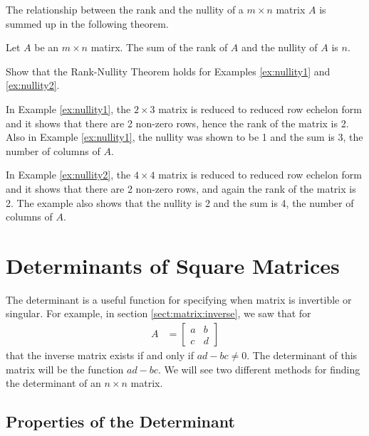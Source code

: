 The relationship between the rank and the nullity of a $m \times n$ matrix $A$ is summed up in the following theorem.

\begin{theorem} \label{thm:rank:nullity}
Let $A$ be an $m \times n$ matirx.  The sum of the rank of $A$ and the nullity of $A$ is $n$. 
\end{theorem}

\begin{example}
Show that the Rank-Nullity Theorem holds for Examples \ref{ex:nullity1} and \ref{ex:nullity2}.

\solution

In Example \ref{ex:nullity1}, the $2 \times 3$ matrix is reduced to reduced row echelon form and it shows that there are 2 non-zero rows, hence the rank of the matrix is 2.  Also in Example \ref{ex:nullity1}, the nullity was shown to be 1 and the sum is 3, the number of columns of $A$. 

In Example \ref{ex:nullity2}, the $4 \times 4$ matrix is reduced to reduced row echelon form and it shows that there are 2 non-zero rows, and again the rank of the matrix is 2.  The example also shows that the nullity is 2 and the sum is 4, the number of columns of $A$.  
\end{example}




\vfill \pagebreak

\section{Determinants of Square Matrices}  
\label{sect:det}

The determinant is a useful function for specifying when matrix is invertible or singular.  For example, in section \ref{sect:matrix:inverse}, we saw that for 
%
\begin{align*}
A & = \begin{bmatrix}
a & b \\ c & d 
\end{bmatrix}
\end{align*}
that the inverse matrix exists if and only if $ad-bc \neq 0$.  The determinant of this matrix will be the function $ad-bc$.  We will see two different methods for finding the determinant of an $n \times n$ matrix.   

\subsection{Properties of the Determinant}  

